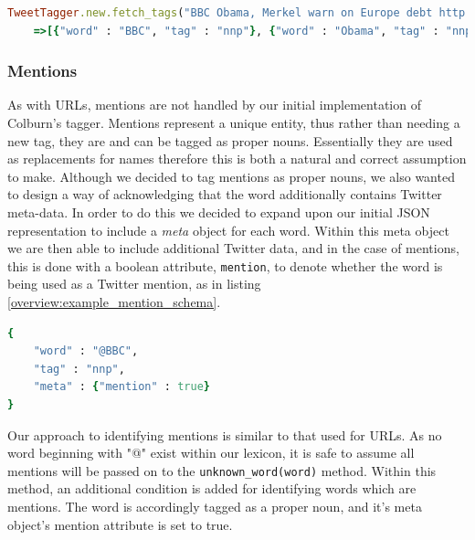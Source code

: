 \begin{lstlisting}[language=Ruby, numbers=none, caption={Example use of split function}, label=overview:example_url_function]
TweetTagger.new.fetch_tags("BBC Obama, Merkel warn on Europe debt http://bbc.in/jfZW3I")
	=>[{"word" : "BBC", "tag" : "nnp"}, {"word" : "Obama", "tag" : "nnp"}, {"word" : ",", "tag" : "ppc"}, {"word" : "Merkel", "tag" : "nnp"}, {"word" : "warn", "tag" : "vbp"}, {"word" : "on", "tag" : "in"}, {"word" : "Europe", "tag" : "nnp"}, {"word" : "debt", "tag" : "nn"}, {"word" : "http://bbc.in/jfZW3I", "tag" : "url"}] 
\end{lstlisting}

\subsubsection{Mentions}

As with URLs, mentions are not handled by our initial implementation of Colburn's tagger. Mentions represent a unique entity, thus rather than needing a new tag, they are and can be tagged as proper nouns. Essentially they are used as replacements for names therefore this is both a natural and correct assumption to make. Although we decided to tag mentions as proper nouns, we also wanted to design a way of acknowledging that the word additionally contains Twitter meta-data. In order to do this we decided to expand upon our initial JSON representation to include a \emph{meta} object for each word. Within this meta object we are then able to include additional Twitter data, and in the case of mentions, this is done with a boolean attribute, \texttt{mention}, to denote whether the word is being used as a Twitter mention, as in listing \ref{overview:example_mention_schema}.

\begin{lstlisting}[language=Ruby, numbers=none, caption={Example JSON structure for representing a mention word}, label=overview:example_mention_schema]
{
	"word" : "@BBC", 
	"tag" : "nnp",
	"meta" : {"mention" : true}
}
\end{lstlisting}

Our approach to identifying mentions is similar to that used for URLs. As no word beginning with "@" exist within our lexicon, it is safe to assume all mentions will be passed on to the \texttt{unknown\_word(word)} method. Within this method, an additional condition is added for identifying words which are mentions. The word is accordingly tagged as a proper noun, and it's meta object's mention attribute is set to true.

